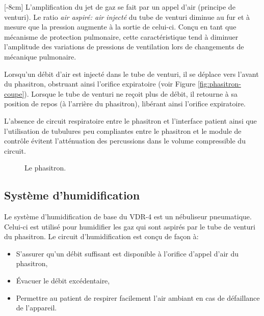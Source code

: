[-8cm]
L'amplification du jet de gaz se fait par un appel d'air (principe de
venturi).  Le ratio \emph{air aspiré: air injecté} du tube de venturi
diminue au fur et à mesure que la pression augmente à la sortie de
celui-ci. Conçu en tant que mécanisme de protection pulmonaire, cette
caractéristique tend à diminuer l'amplitude des variations de
pressions de ventilation lors de changements de mécanique pulmonaire.

Lorsqu'un débit d'air est injecté dans le tube de venturi, il se
déplace vers l'avant du phasitron, obstruant ainsi l'orifice
expiratoire (voir Figure \ref{fig:phasitron-coupe}). Lorsque le tube
de venturi ne reçoit plus de débit, il retourne à sa position de repos
(à l'arrière du phasitron), libérant ainsi l'orifice expiratoire.

L'absence de circuit respiratoire entre le phasitron et l'interface
patient ainsi que l'utilisation de tubulures peu compliantes entre le
phasitron et le module de contrôle évitent l'atténuation des
percussions dans le volume compressible du circuit.

\begin{figure}
	
	\caption{Le phasitron.}
\end{figure}

\subsection{Système d'humidification}

Le système d'humidification de base du VDR-4 est un nébuliseur pneumatique.
Celui-ci est utilisé pour humidifier les gaz qui sont aspirés par le tube de
venturi du phasitron. Le circuit d'humidification est conçu de façon à:

\begin{itemize}
	\item S'assurer qu'un débit suffisant est disponible à l'orifice d'appel d'air du phasitron,
	\item Évacuer le débit excédentaire,
	\item Permettre au patient de respirer facilement l'air ambiant en cas de défaillance de l'appareil.
\end{itemize}

